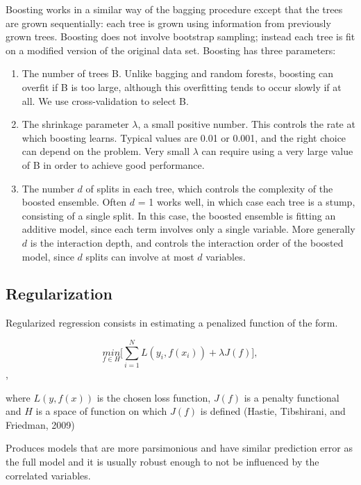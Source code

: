 Boosting works in a similar way of the bagging procedure except that the trees are grown sequentially: each tree is grown using information from previously grown trees. Boosting does not involve bootstrap sampling; instead each tree is fit on a modified version of the original data set. Boosting has three parameters:

\begin{enumerate}
    \item The number of trees B. Unlike bagging and random forests, boosting can overfit if B is too large, although this overfitting tends to occur slowly if at all. We use cross-validation to select B.
    
    \item The shrinkage parameter $\lambda$, a small positive number. This controls the rate at which boosting learns. Typical values are 0.01 or 0.001, and the right choice can depend on the problem. Very small $\lambda$ can require using a very large value of B in order to achieve good performance.
    
    \item The number $d$ of splits in each tree, which controls the complexity of the boosted ensemble. Often $d$ = 1 works well, in which case each tree is a stump, consisting of a single split. In this case, the boosted ensemble is fitting an additive model, since each term involves only a single variable. More generally $d$ is the interaction depth, and controls the interaction order of the boosted model, since $d$ splits can involve at most $d$ variables.
\end{enumerate}

\subsection{Regularization}
Regularized regression consists in estimating a penalized function of the form.

\begin{equation}
\underset{f \in H}{min} \Big[ \sum_{i = 1}^{N}
L(y_i, f(x_i)) + \lambda J(f) \Big ], 
\end{equation},

where $L(y, f(x))$ is the chosen loss function, $J(f)$ is a penalty functional and $H$ is a space of function on which $J(f)$ is defined (Hastie, Tibshirani, and Friedman, 2009)

Produces models that are more parsimonious and have similar prediction error as the full model and it is usually robust enough to not be influenced by the correlated variables. 
    
